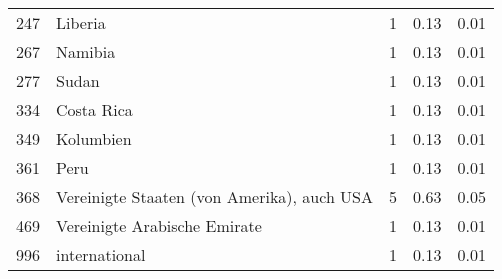\begin{longtable}{lXrrr}
        247 & \multicolumn{1}{X}{Liberia} & %
          \num{1} &
          \num[round-mode=places,round-precision=2]{0.13} &
          \num[round-mode=places,round-precision=2]{0.01} \\

        267 & \multicolumn{1}{X}{Namibia} & %
          \num{1} &
          \num[round-mode=places,round-precision=2]{0.13} &
          \num[round-mode=places,round-precision=2]{0.01} \\

        277 & \multicolumn{1}{X}{Sudan} & %
          \num{1} &
          \num[round-mode=places,round-precision=2]{0.13} &
          \num[round-mode=places,round-precision=2]{0.01} \\

        334 & \multicolumn{1}{X}{Costa Rica} & %
          \num{1} &
          \num[round-mode=places,round-precision=2]{0.13} &
          \num[round-mode=places,round-precision=2]{0.01} \\

        349 & \multicolumn{1}{X}{Kolumbien} & %
          \num{1} &
          \num[round-mode=places,round-precision=2]{0.13} &
          \num[round-mode=places,round-precision=2]{0.01} \\

        361 & \multicolumn{1}{X}{Peru} & %
          \num{1} &
          \num[round-mode=places,round-precision=2]{0.13} &
          \num[round-mode=places,round-precision=2]{0.01} \\

        368 & \multicolumn{1}{X}{Vereinigte Staaten (von Amerika), auch USA} & %
          \num{5} &
          \num[round-mode=places,round-precision=2]{0.63} &
          \num[round-mode=places,round-precision=2]{0.05} \\

        469 & \multicolumn{1}{X}{Vereinigte Arabische Emirate} & %
          \num{1} &
          \num[round-mode=places,round-precision=2]{0.13} &
          \num[round-mode=places,round-precision=2]{0.01} \\

        996 & \multicolumn{1}{X}{international} & %
          \num{1} &
          \num[round-mode=places,round-precision=2]{0.13} &
          \num[round-mode=places,round-precision=2]{0.01} \\


\end{longtable}
